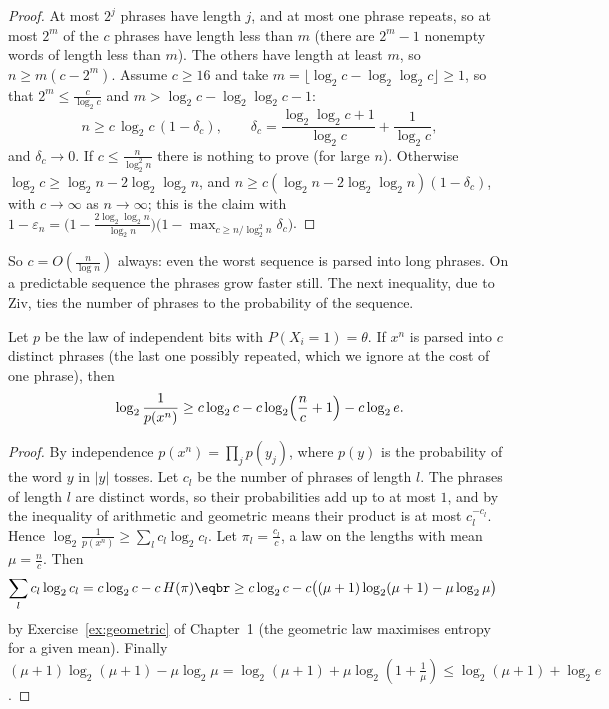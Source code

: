 \begin{proof}
At most $2^j$ phrases have length $j$, and at most one phrase repeats, so at most $2^m$ of the $c$ phrases have length less than $m$ (there are $2^m-1$ nonempty words of length less than $m$). The others have length at least $m$, so $n\ge m(c-2^m)$. Assume $c\ge16$ and take $m=\lfloor\log_2c-\log_2\log_2c\rfloor\ge1$, so that $2^m\le\frac c{\log_2c}$ and $m>\log_2c-\log_2\log_2c-1$:
\[
n\ge c\,\log_2c\,(1-\delta_c),\qquad\delta_c=\frac{\log_2\log_2c+1}{\log_2c}+\frac1{\log_2c},
\]
and $\delta_c\to0$. If $c\le\frac n{\log_2^2n}$ there is nothing to prove (for large $n$). Otherwise $\log_2c\ge\log_2n-2\log_2\log_2n$, and $n\ge c(\log_2n-2\log_2\log_2n)(1-\delta_c)$, with $c\to\infty$ as $n\to\infty$; this is the claim with $1-\varepsilon_n=\bigl(1-\frac{2\log_2\log_2n}{\log_2n}\bigr)\bigl(1-\max_{c\ge n/\log_2^2n}\delta_c\bigr)$.
\end{proof}

So $c=O(\frac n{\log n})$ always: even the worst sequence is parsed into long phrases. On a predictable sequence the phrases grow faster still. The next inequality, due to Ziv, ties the number of phrases to the probability of the sequence.

\begin{lemma}\label{lem:ziv}
Let $p$ be the law of independent bits with $P(X_i=1)=\theta$. If $x^n$ is parsed into $c$ distinct phrases (the last one possibly repeated, which we ignore at the cost of one phrase), then
\[
\log_2\frac1{p(x^n)}\ge c\log_2c-c\log_2\Bigl(\frac nc+1\Bigr)-c\log_2e.
\]
\end{lemma}

\begin{proof}
By independence $p(x^n)=\prod_jp(y_j)$, where $p(y)$ is the probability of the word $y$ in $|y|$ tosses. Let $c_l$ be the number of phrases of length $l$. The phrases of length $l$ are distinct words, so their probabilities add up to at most $1$, and by the inequality of arithmetic and geometric means their product is at most $c_l^{-c_l}$. Hence $\log_2\frac1{p(x^n)}\ge\sum_lc_l\log_2c_l$. Let $\pi_l=\frac{c_l}c$, a law on the lengths with mean $\mu=\frac nc$. Then
\[
\begin{aligned}\sum_lc_l\log_2c_l&=c\log_2c-c\,H(\pi)\eqbr\ge c\log_2c-c\bigl((\mu+1)\log_2(\mu+1)-\mu\log_2\mu\bigr)\end{aligned}
\]
by Exercise~\ref{ex:geometric} of Chapter~1 (the geometric law maximises entropy for a given mean). Finally $(\mu+1)\log_2(\mu+1)-\mu\log_2\mu=\log_2(\mu+1)+\mu\log_2(1+\frac1\mu)\le\log_2(\mu+1)+\log_2e$.
\end{proof}

